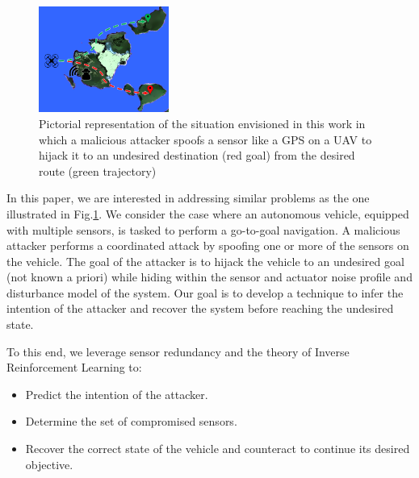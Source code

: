 \documentclass[letterpaper, 10 pt, conference]{ieeeconf}  %
\begin{document}
\begin{figure}[t]
\centering
\includegraphics[width=0.38\textwidth]{problem}
\caption{Pictorial representation of the situation envisioned in this work in which a malicious attacker spoofs a sensor like a GPS on a UAV to hijack it to an undesired destination (red goal) from the desired route (green trajectory)}
 \label{fig:problem}
\end{figure}


In this paper, we are interested in addressing similar problems as the one illustrated in Fig.\ref{fig:problem}. We consider the case where an autonomous vehicle, equipped with multiple sensors, is tasked to perform a go-to-goal navigation. 
A malicious attacker performs a coordinated attack by spoofing one or more of the sensors on the vehicle. The goal of the attacker is to hijack the vehicle to an undesired goal (not known a priori) while hiding within the sensor and actuator noise profile and disturbance model of the system. 
Our goal is to develop a technique to infer the intention of the attacker and recover the system before reaching the undesired state. 


To this end, we leverage sensor redundancy and the theory of Inverse Reinforcement Learning to:
\begin{itemize}
    \item Predict the intention of the attacker.
    \item Determine the set of compromised sensors.
    \item Recover the correct state of the vehicle and counteract to continue its desired objective. 
\end{itemize}
\end{document}
